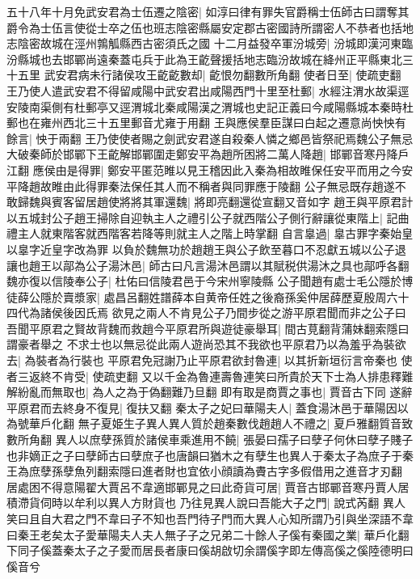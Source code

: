 五十八年十月免武安君為士伍遷之陰密|{
	如淳曰律有罪失官爵稱士伍師古曰謂奪其爵令為士伍言使從士卒之伍也班志陰密縣屬安定郡古密國詩所謂密人不恭者也括地志陰密故城在涇州鶉觚縣西古密須氏之國}
十二月益發卒軍汾城旁|{
	汾城即漢河東臨汾縣城也去邯鄲尚遠秦蓋屯兵于此為王齕聲援括地志臨汾故城在絳州正平縣東北三十五里}
武安君病未行諸侯攻王齕齕數却|{
	齕恨勿翻數所角翻}
使者日至|{
	使疏吏翻}
王乃使人遣武安君不得留咸陽中武安君出咸陽西門十里至杜郵|{
	水經注渭水故渠逕安陵南渠側有杜郵亭又逕渭城北秦咸陽漢之渭城也史記正義曰今咸陽縣城本秦時杜郵也在雍州西北三十五里郵音尤雍于用翻}
王與應侯羣臣謀曰白起之遷意尚怏怏有餘言|{
	怏于兩翻}
王乃使使者賜之劍武安君遂自殺秦人憐之鄉邑皆祭祀焉魏公子無忌大破秦師於邯鄲下王齕解邯鄲圍走鄭安平為趙所困將二萬人降趙|{
	邯鄲音寒丹降戶江翻}
應侯由是得罪|{
	鄭安平匿范睢以見王稽因此入秦為相故睢保任安平而用之今安平降趙故睢由此得罪秦法保任其人而不稱者與同罪應于陵翻}
公子無忌既存趙遂不敢歸魏與賓客留居趙使將將其軍還魏|{
	將即亮翻還從宣翻又音如字}
趙王與平原君計以五城封公子趙王掃除自迎執主人之禮引公子就西階公子側行辭讓從東階上|{
	記曲禮主人就東階客就西階客若降等則就主人之階上時掌翻}
自言辠過|{
	辠古罪字秦始皇以辠字近皇字改為罪}
以負於魏無功於趙趙王與公子飲至暮口不忍獻五城以公子退讓也趙王以鄗為公子湯沐邑|{
	師古曰凡言湯沐邑謂以其賦税供湯沐之具也鄗呼各翻}
魏亦復以信陵奉公子|{
	杜佑曰信陵君邑于今宋州寧陵縣}
公子聞趙有處士毛公隱於博徒薛公隱於賣漿家|{
	處昌呂翻姓譜薛本自黄帝任姓之後裔孫奚仲居薛歷夏殷周六十四代為諸侯後因氏焉}
欲見之兩人不肯見公子乃間步從之游平原君聞而非之公子曰吾聞平原君之賢故背魏而救趙今平原君所與遊徒豪舉耳|{
	間古莧翻背蒲妹翻索隱曰謂豪者舉之}
不求士也以無忌從此兩人遊尚恐其不我欲也平原君乃以為羞乎為裝欲去|{
	為裝者為行裝也}
平原君免冠謝乃止平原君欲封魯連|{
	以其折新垣衍言帝秦也}
使者三返終不肯受|{
	使疏吏翻}
又以千金為魯連壽魯連笑曰所貴於天下士為人排患釋難解紛亂而無取也|{
	為人之為于偽翻難乃旦翻}
即有取是商賈之事也|{
	賈音古下同}
遂辭平原君而去終身不復見|{
	復扶又翻}
秦太子之妃曰華陽夫人|{
	蓋食湯沐邑于華陽因以為號華戶化翻}
無子夏姫生子異人異人質於趙秦數伐趙趙人不禮之|{
	夏戶雅翻質音致數所角翻}
異人以庶孽孫質於諸侯車乘進用不饒|{
	張晏曰孺子曰孽子何休曰孽子賤子也非嫡正之子曰孽師古曰孽庶子也唐韻曰猶木之有孽生也異人于秦太子為庶子于秦王為庶孽孫孽魚列翻索隱曰進者財也宜依小顔讀為賮古字多假借用之進音才刃翻}
居處困不得意陽翟大賈呂不韋適邯鄲見之曰此奇貨可居|{
	賈音古邯鄲音寒丹賈人居積滯貨伺時以牟利以異人方財貨也}
乃往見異人說曰吾能大子之門|{
	說式芮翻}
異人笑曰且自大君之門不韋曰子不知也吾門待子門而大異人心知所謂乃引與坐深語不韋曰秦王老矣太子愛華陽夫人夫人無子子之兄弟二十餘人子傒有秦國之業|{
	華戶化翻下同子傒蓋秦太子之子愛而居長者康曰傒胡啟切余謂傒字即左傳高傒之傒陸德明曰傒音兮}
